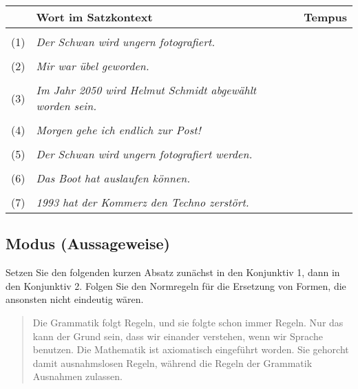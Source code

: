 \documentclass[12pt,a4paper,twoside]{article}
\newcommand{\Doppelzeile}{\vspace{2\baselineskip}}
\begin{document}
\begin{center}
  \begin{tabular}[h]{clp{}}
    \toprule
    & \textbf{Wort im Satzkontext} & \textbf{Tempus} \\
    \midrule
    && \\
    (1) & \textit{Der Schwan wird ungern fotografiert.}                     &  \\ \cline{3-3}
    && \\
    (2) & \textit{Mir war übel geworden.}                                   &  \\ \cline{3-3}
    && \\
    (3) & \textit{Im  Jahr 2050 wird Helmut Schmidt abgewählt worden sein.} &  \\ \cline{3-3}
    && \\
    (4) & \textit{Morgen gehe ich endlich zur Post!}                        &  \\ \cline{3-3}
    && \\
    (5) & \textit{Der Schwan wird ungern fotografiert werden.}              &  \\ \cline{3-3}
    && \\
    (6) & \textit{Das Boot hat auslaufen können.}                           &  \\ \cline{3-3}
    && \\
    (7) & \textit{1993 hat der Kommerz den Techno zerstört.}                &  \\ \cline{3-3}
  \end{tabular}
\end{center}

\Doppelzeile

\subsection{ Modus (Aussageweise)}

Setzen Sie den folgenden kurzen Absatz zunächst in den Konjunktiv 1, dann in den Konjunktiv 2.
Folgen Sie den Normregeln für die Ersetzung von Formen, die ansonsten nicht eindeutig wären.

\begin{quote}
  Die Grammatik folgt Regeln, und sie folgte schon immer Regeln.
  Nur das kann der Grund sein, dass wir einander verstehen, wenn wir Sprache benutzen.
  Die Mathematik ist axiomatisch eingeführt worden.
  Sie gehorcht damit ausnahmslosen Regeln, während die Regeln der Grammatik Ausnahmen zulassen.
\end{quote}
\end{document}
